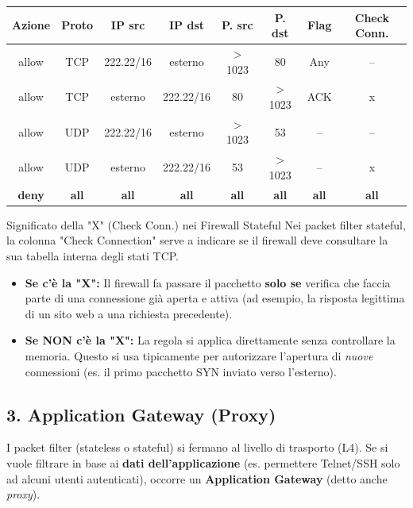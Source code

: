 \documentclass[a4paper,12pt]{report}
\renewcommand{\arraystretch}{1.2} %
\begin{document}
\begin{center}
\small
\renewcommand{\arraystretch}{1.3}
\begin{tabular}{cccccccc}
\toprule
\textbf{Azione} & \textbf{Proto} & \textbf{IP src} & \textbf{IP dst} & \textbf{P. src} & \textbf{P. dst} & \textbf{Flag} & \textbf{Check Conn.} \\
\midrule
allow & TCP & 222.22/16 & esterno & $>$1023 & 80 & Any & -- \\
allow & TCP & esterno & 222.22/16 & 80 & $>$1023 & ACK & x \\
allow & UDP & 222.22/16 & esterno & $>$1023 & 53 & -- & -- \\
allow & UDP & esterno & 222.22/16 & 53 & $>$1023 & -- & x \\
\rowcolor{red!15}\textbf{deny} & \textbf{all} & \textbf{all} & \textbf{all} & \textbf{all} & \textbf{all} & \textbf{all} & \textbf{all} \\
\bottomrule
\end{tabular}
\end{center}
\begin{notebox}{Significato della "X" (Check Conn.) nei Firewall Stateful}
    Nei packet filter stateful, la colonna "Check Connection" serve a indicare se il firewall deve consultare la sua tabella interna degli stati TCP.
        \begin{itemize}
            \item \textbf{Se c'è la "X":} Il firewall fa passare il pacchetto \textbf{solo se} verifica che faccia parte di una connessione già aperta e attiva  (ad esempio, la risposta legittima di un sito web a una richiesta precedente).
            \item \textbf{Se NON c'è la "X":} La regola si applica direttamente senza controllare la memoria. Questo si usa tipicamente per autorizzare l'apertura di \textit{nuove} connessioni (es. il primo pacchetto SYN inviato verso l'esterno).
        \end{itemize}
\end{notebox}

\newpage
\subsection{3. Application Gateway (Proxy)}


I packet filter (stateless o stateful) si fermano al livello di trasporto (L4).
Se si vuole filtrare in base ai \textbf{dati dell'applicazione}
(es. permettere Telnet/SSH solo ad alcuni utenti autenticati),
occorre un \textbf{Application Gateway} (detto anche \textit{proxy}).
\end{document}

